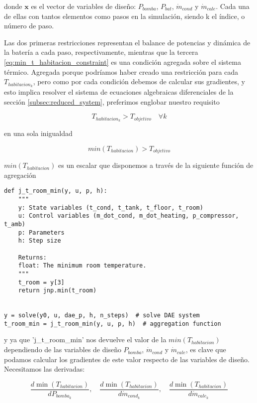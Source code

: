 donde $\mathbf{x}$ es el vector de variables de diseño: $P_{bomba}$, $P_{bat}$,
$\dot{m}_{cond}$ y $\dot{m}_{cale}$. Cada una de ellas con tantos elementos
como pasos en la simulación, siendo k el índice, o número de paso.

Las dos primeras restricciones representan el balance de potencias y dinámica
de la batería a cada paso, respectivamente, mientras que la tercera
\eqref{eq:min_t_habitacion_constraint} es una condición agregada sobre el
sistema térmico. Agregada porque podríamos haber creado una restricción para
cada $T_{habitacion_k}$, pero como por cada condición debemos de calcular sus
gradientes, y esto implica resolver el sistema de ecuaciones algebraicas
diferenciales de la sección \ref{subsec:reduced_system}, preferimos englobar
nuestro requisito

\begin{equation*}
	T_{habitacion_k} > T_{objetivo}  \quad \forall k
\end{equation*}

en una sola inigualdad

\begin{equation*}
	min(T_{habitacion}) > T_{objetivo}
\end{equation*}


$min(T_{habitacion})$ es un escalar que disponemos a través de la siguiente
función de agregación

\begin{verbatim}
def j_t_room_min(y, u, p, h):
    """
    y: State variables (t_cond, t_tank, t_floor, t_room)
    u: Control variables (m_dot_cond, m_dot_heating, p_compressor, t_amb)
    p: Parameters
    h: Step size

    Returns:
    float: The minimum room temperature.
    """
    t_room = y[3]
    return jnp.min(t_room)


y = solve(y0, u, dae_p, h, n_steps)  # solve DAE system
t_room_min = j_t_room_min(y, u, p, h)  # aggregation function
\end{verbatim}


y ya que 'j\_t\_room\_min' nos devuelve el valor de la $min(T_{habitacion})$
dependiendo de las variables de diseño $P_{bomba}$, $\dot{m}_{cond}$ y
$\dot{m}_{cale}$, es clave que podamos calcular los gradientes de este valor
respecto de las variables de diseño. Necesitamos las derivadas:

\begin{equation*}
	\frac{d \min(T_{habitacion})}{d P_{bomba_k}}, \quad \frac{d \min(T_{habitacion})}{d \dot{m}_{cond_k}}, \quad \frac{d \min(T_{habitacion})}{d \dot{m}_{cale_k}}
\end{equation*}

